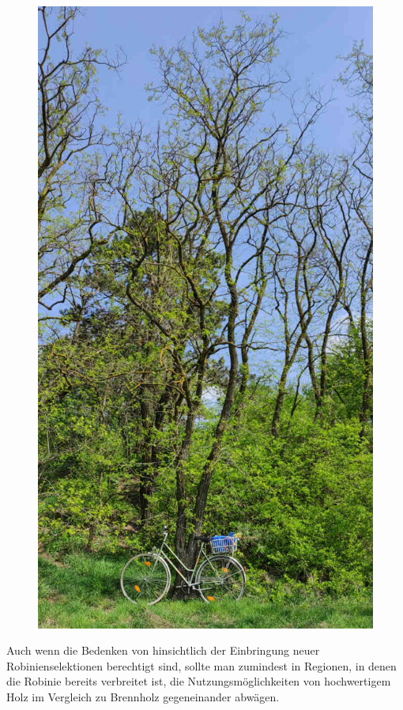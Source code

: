 \documentclass[twocolumn]{scrartcl}
\begin{document}
\begin{figure}[htbp]
  \centering
  \includegraphics[width=.9\linewidth]{./bild/roninieLokal}
  \label{fig:robLokalErnstbrunn}
\end{figure}

Auch wenn die Bedenken von \citet{bouteiller2019robinie} hinsichtlich
der Einbringung neuer Robinienselektionen berechtigt sind, sollte man
zumindest in Regionen, in denen die Robinie bereits verbreitet ist,
die Nutzungsmöglichkeiten von hochwertigem Holz im Vergleich zu
Brennholz gegeneinander abwägen.
\end{document}
